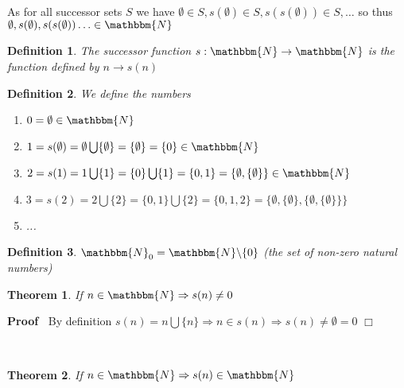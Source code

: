 \documentclass{book}
\newenvironment{proof}{\noindent\textbf{Proof\ }}{\hspace*{\fill}$\Box$\medskip}
\newtheorem{definition}{Definition}
{\theorembodyfont{\rmfamily}\newtheorem{example}{Example}}
\newtheorem{theorem}{Theorem}
\begin{document}
{{As for all successor sets $S$ we have $\emptyset \in S, s (\emptyset) \in S, s
(s (\emptyset)) \in S, \ldots$ so thus $\emptyset, s (\emptyset), s (s
(\emptyset)) \ldots \in \mathbbm{N}$

\begin{definition}
  The successor function $s : \mathbbm{N} \rightarrow \mathbbm{N}$ is the
  function defined by $n \rightarrow s (n)$
\end{definition}

\begin{definition}
  \label{0 is a natural number}We define the numbers \
  \begin{enumerate}
    \item $0 = \emptyset \in \mathbbm{N}$
    
    \item $1 = s (\emptyset) = \emptyset \bigcup \{ \emptyset \} = \{
    \emptyset \} = \{ 0 \} \in \mathbbm{N}$
    
    \item $2 = s (1) = 1 \bigcup \{ 1 \} = \{ 0 \} \bigcup \{ 1 \} = \{ 0, 1
    \} = \{ \emptyset, \{ \emptyset \} \} \in \mathbbm{N}$
    
    \item $3 = s (2) = 2 \bigcup \{ 2 \} = \{ 0, 1 \} \bigcup \{ 2 \} = \{ 0,
    1, 2 \} = \{ \emptyset, \{ \emptyset \}, \{ \emptyset, \{ \emptyset \} \}
    \}$
    
    \item ...
  \end{enumerate}
\end{definition}

\begin{definition}
  $\mathbbm{N}_0 =\mathbbm{N} \backslash \{ 0 \}$ (the set of non-zero natural
  numbers)
\end{definition}

\begin{theorem}
  \label{successor of zero is not zero}If $n \in \mathbbm{N} \Rightarrow s (n)
  \neq 0$
\end{theorem}

\begin{proof}
  By definition $s (n) = n \bigcup \{ n \} \Rightarrow n \in s (n) \Rightarrow
  s (n) \neq \emptyset = 0$
\end{proof}

\

\begin{theorem}
  \label{successor of a natural number is a natural number}If $n \in
  \mathbbm{N} \Rightarrow s (n) \in \mathbbm{N}$
\end{theorem}

}}
\end{document}
